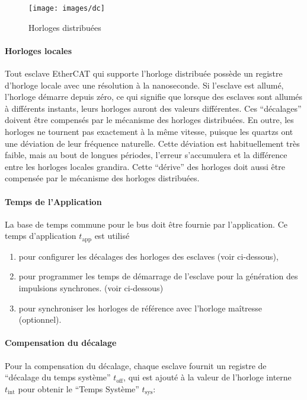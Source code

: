 \documentclass[a4paper,12pt,BCOR=6mm,bibtotoc,idxtotoc]{scrbook}
\begin{document}
\begin{figure}[htbp]
  \centering
  \texttt{[image: images/dc]}
  \caption{Horloges distribu\'ees}
  \label{fig:dc}
\end{figure}

\paragraph{Horloges locales} Tout esclave EtherCAT qui supporte
l'horloge distribu\'ee
poss\`ede un registre d'horloge locale avec une r\'esolution \`a la
nanoseconde.  Si l'esclave est allum\'e, l'horloge d\'emarre depuis
z\'ero, ce qui signifie que lorsque des esclaves sont allum\'es \`a
diff\'erents instants, leurs horloges auront des valeurs diff\'erentes.
Ces ``d\'ecalages'' doivent \^etre compens\'es par le m\'ecanisme des
horloges distribu\'ees.  En outre, les horloges ne tournent
pas exactement \`a la m\^eme vitesse, puisque les quartzs ont une
d\'eviation de leur fr\'equence naturelle.  Cette d\'eviation est
habituellement tr\`es faible, mais au bout de longues p\'eriodes,
l'erreur s'accumulera et la diff\'erence entre les horloges locales
grandira. Cette ``d\'erive'' des horloges doit aussi \^etre
compens\'ee par le m\'ecanisme des horloges distribu\'ees.

\paragraph{Temps de l'Application} La base de temps commune pour le bus
doit \^etre fournie par l'application.
Ce temps d'application $t_\text{app}$ est utilis\'e

\begin{enumerate}
\item pour configurer les d\'ecalages des horloges des esclaves (voir ci-dessous),
\item pour programmer les temps de d\'emarrage de l'esclave pour
  la g\'en\'eration des impulsions synchrones. (voir ci-dessous)
\item pour synchroniser les horloges de r\'ef\'erence avec l'horloge
  ma\^itresse (optionnel).
\end{enumerate}

\paragraph{Compensation du d\'ecalage} Pour la compensation du d\'ecalage,
chaque esclave fournit un registre de ``d\'ecalage du temps
syst\`eme'' $t_\text{off}$, qui est ajout\'e \`a la valeur de
l'horloge interne $t_\text{int}$ pour obtenir le ``Temps Syst\`eme''
$t_\text{sys}$:
\end{document}
